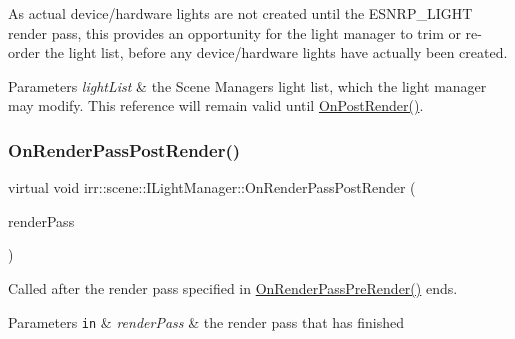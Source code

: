 As actual device/hardware lights are not created until the E\+S\+N\+R\+P\+\_\+\+L\+I\+G\+HT render pass, this provides an opportunity for the light manager to trim or re-\/order the light list, before any device/hardware lights have actually been created. 
\begin{DoxyParams}{Parameters}
{\em light\+List} & the Scene Manager\textquotesingle{}s light list, which the light manager may modify. This reference will remain valid until \hyperlink{classirr_1_1scene_1_1ILightManager_ac8f92f0fbd43ba9cb01b47647125a1a3}{On\+Post\+Render()}. \\
\hline
\end{DoxyParams}
\mbox{\label{classirr_1_1scene_1_1ILightManager_a189edbf3a16ebb3c82e5d9f93dd2b41b}} 
\subsubsection{\texorpdfstring{On\+Render\+Pass\+Post\+Render()}{OnRenderPassPostRender()}}
{\footnotesize\ttfamily virtual void irr\+::scene\+::\+I\+Light\+Manager\+::\+On\+Render\+Pass\+Post\+Render (\begin{DoxyParamCaption}\item[{\hyperlink{namespaceirr_1_1scene_a7862269bd1abc123929d4dbb8200d67f}{E\+\_\+\+S\+C\+E\+N\+E\+\_\+\+N\+O\+D\+E\+\_\+\+R\+E\+N\+D\+E\+R\+\_\+\+P\+A\+SS}}]{render\+Pass }\end{DoxyParamCaption})\hspace{0.3cm}{\ttfamily [pure virtual]}}



Called after the render pass specified in \hyperlink{classirr_1_1scene_1_1ILightManager_a56eaec6a697659f40b4f29b681fbdfad}{On\+Render\+Pass\+Pre\+Render()} ends. 


\begin{DoxyParams}[1]{Parameters}
\mbox{\tt in}  & {\em render\+Pass} & the render pass that has finished \\
\hline
\end{DoxyParams}
\mbox{\label{classirr_1_1scene_1_1ILightManager_a56eaec6a697659f40b4f29b681fbdfad}} 
